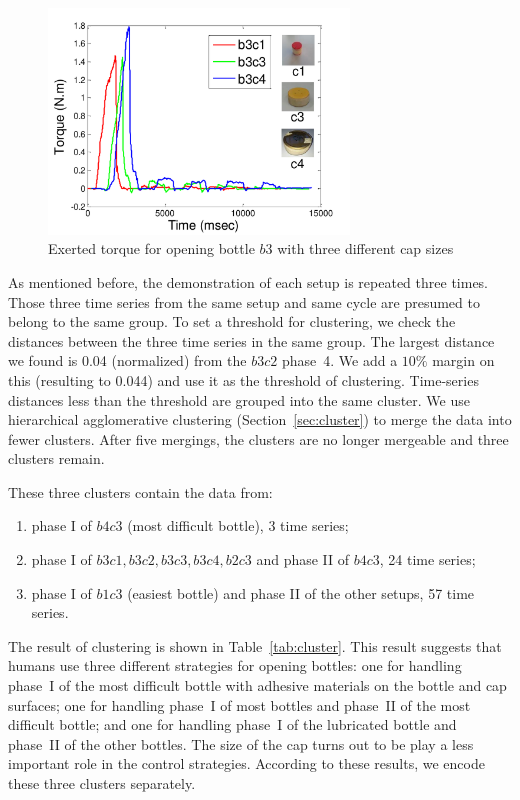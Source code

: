 \begin{figure}
    \centering
    \includegraphics[width=8cm]{./fig/c1c3c4_time_T.pdf}
    \caption{ \scriptsize{Exerted torque for opening bottle $b3$ with three different cap sizes}
}
\label{fig:cappatterns}
\end{figure}


As mentioned before, the demonstration of each setup is repeated three
times. Those three time series from the same setup and same cycle are presumed to
belong to the same group. To set a threshold for clustering, we
check the distances between the three time series in the same group. The largest distance we found is 0.04
(normalized) from the $b3c2$ phase~4. We add a $10\%$ margin on this
(resulting to 0.044) and use it as the threshold of
clustering. Time-series distances less than the threshold are grouped
into the same cluster. We use hierarchical agglomerative
clustering (Section~\ref{sec:cluster}) to merge the data into
fewer clusters. After five mergings, the clusters are no longer
mergeable and three clusters remain.

These three clusters contain the data from:

\begin{enumerate}
\item phase I of $b4c3$ (most difficult bottle), 3 time series;
\item phase I of $b3c1, b3c2, b3c3, b3c4, b2c3$ and phase II of $b4c3$, 24 time series;
\item phase I of $b1c3$ (easiest bottle) and phase II of the other setups, 57 time series.
\end{enumerate}

The result of clustering is shown in Table~\ref{tab:cluster}. This
result suggests that humans use three different strategies for opening
bottles: one for handling phase~I of the most difficult bottle with
adhesive materials on the bottle and cap surfaces; one for handling
phase~I of most bottles and phase~II of the most difficult bottle; and
one for handling phase~I of the lubricated bottle and phase~II of the
other bottles. The size of the cap turns out to be play a less
important role in the control strategies. According to these results, we
encode these three clusters separately.



